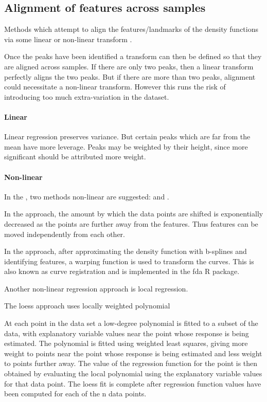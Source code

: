 \subsection{Alignment of features across samples}

Methods which attempt to align the features/landmarks of the density functions via some linear or non-linear transform \citep{Hahne:2009hl}.

Once the peaks have been identified a transform can then be defined so that they are aligned across samples.
If there are only two peaks, then a linear transform perfectly aligns the two peaks.
But if there are more than two peaks, alignment could necessitate a non-linear transform.
However this runs the risk of introducing too much extra-variation in the dataset.

\paragraph{Linear}

Linear regression preserves variance.
But certain peaks which are far from the mean have more leverage.
Peaks may be weighted by their height, since more significant should be attributed more weight.


\paragraph{Non-linear}

In the , two methods non-linear are suggested:  and .

In the  approach, the amount by which the data points are shifted is exponentially decreased as the points are further away from the features.
Thus features can be moved independently from each other.

In the  approach, after approximating the density function with b-splines and identifying features, a warping function is used to transform the curves.
This is also known as curve registration and is implemented in the fda R package.

Another non-linear regression approach is local regression.

The loess approach uses locally weighted polynomial

At each point in the data set a low-degree polynomial is fitted to a subset of the data, with explanatory variable values near the point whose response is being estimated.
The polynomial is fitted using weighted least squares, giving more weight to points near the point whose response is being estimated and less weight to points further away.
The value of the regression function for the point is then obtained by evaluating the local polynomial using the explanatory variable values for that data point.
The loess fit is complete after regression function values have been computed for each of the n data points.

